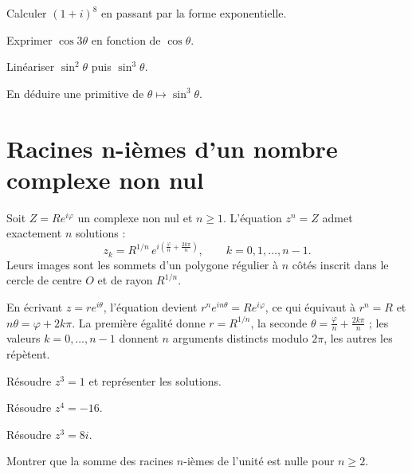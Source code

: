 \begin{entrainement}
\exo[\niveau{1}] Calculer $(1+i)^{8}$ en passant par la forme exponentielle.

\exo[\niveau{2}] Exprimer $\cos3\theta$ en fonction de $\cos\theta$.

\exo[\niveau{2}] Linéariser $\sin^{2}\theta$ puis $\sin^{3}\theta$.

\exo[\niveau{3}] En déduire une primitive de $\theta \mapsto \sin^{3}\theta$.
\end{entrainement}

\section{Racines n-ièmes d'un nombre complexe non nul}

\begin{theoreme}
Soit $Z = Re^{i\varphi}$ un complexe non nul et $n \geq 1$. L'équation
$z^{n} = Z$ admet exactement $n$ solutions :
\[
  z_{k} = R^{1/n}\,e^{i\left(\frac{\varphi}{n}+\frac{2k\pi}{n}\right)},
  \qquad k = 0,1,\dots,n-1 .
\]
Leurs images sont les sommets d'un polygone régulier à $n$ côtés inscrit dans
le cercle de centre $O$ et de rayon $R^{1/n}$.
\end{theoreme}

\begin{demonstration}
En écrivant $z = re^{i\theta}$, l'équation devient $r^{n}e^{in\theta}
= Re^{i\varphi}$, ce qui équivaut à $r^{n} = R$ et
$n\theta = \varphi+2k\pi$. La première égalité donne $r = R^{1/n}$, la seconde
$\theta = \frac{\varphi}{n}+\frac{2k\pi}{n}$ ; les valeurs $k = 0,\dots,n-1$
donnent $n$ arguments distincts modulo $2\pi$, les autres les répètent.
\end{demonstration}

\begin{entrainement}
\exo[\niveau{1}] Résoudre $z^{3} = 1$ et représenter les solutions.

\exo[\niveau{2}] Résoudre $z^{4} = -16$.

\exo[\niveau{2}] Résoudre $z^{3} = 8i$.

\exo[\niveau{3}] Montrer que la somme des racines $n$-ièmes de l'unité est
nulle pour $n \geq 2$.
\end{entrainement}

